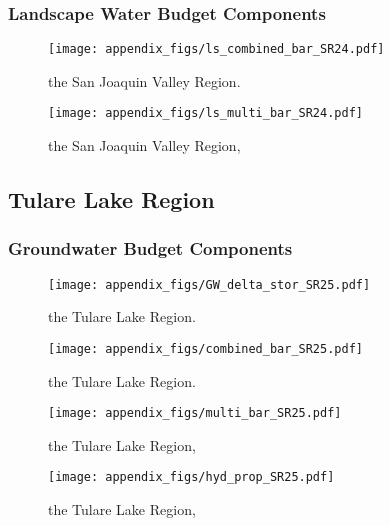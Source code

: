 \subsubsection{Landscape Water Budget Components}
\begin{figure}[ht]
\centerline{\texttt{[image: appendix\_figs/ls\_combined\_bar\_SR24.pdf]}}
\caption{\LSCombinedTextOne the San Joaquin Valley Region.\LSCombinedTextTwo}
\label{fig:LS_budget_SR24}
\end{figure}
\newpage

\begin{landscape}
\begin{figure}[ht]
\centerline{\texttt{[image: appendix\_figs/ls\_multi\_bar\_SR24.pdf]}}
\caption{\LSMultiTextOne the San Joaquin Valley Region,\LSMultiTextTwo}
\label{fig:multi_LS_budget_SR24}
\end{figure}
\newpage
\end{landscape}

\subsection{Tulare Lake Region}
\subsubsection{Groundwater Budget Components}
\begin{figure}[h]
\centerline{\texttt{[image: appendix\_figs/GW\_delta\_stor\_SR25.pdf]}}
\caption{\GWBudgetText the Tulare Lake Region.}
\label{fig:delta_stor_SR25}
\end{figure}
\newpage

\begin{figure}[ht]
\centerline{\texttt{[image: appendix\_figs/combined\_bar\_SR25.pdf]}}
\caption{\GWCombinedTextOne the Tulare Lake Region.\GWCombinedTextTwo}
\label{fig:GW_budget_SR25}
\end{figure}
\newpage

\begin{landscape}
\begin{figure}[ht]
\centerline{\texttt{[image: appendix\_figs/multi\_bar\_SR25.pdf]}}
\caption{\GWMultiTextOne the Tulare Lake Region,\GWMultiTextTwo}
\label{fig:multi_GW_budget_SR25}
\end{figure}
\newpage

\begin{figure}[ht]
\centerline{\texttt{[image: appendix\_figs/hyd\_prop\_SR25.pdf]}}
\caption{\HydPropOne the Tulare Lake Region,\HydPropTwo}
\label{fig:hyd_prop_SR25}
\end{figure}
\newpage
\end{landscape}

